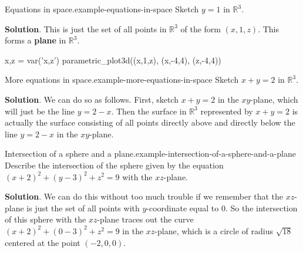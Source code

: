 \documentclass[10pt,]{book}
\newcommand{\terminology}[1]{\textbf{#1}}
\numberwithin{equation}{section}
\newcommand{\RR}{\mathbb{R}}
\begin{document}
\begin{example}{Equations in space.}{example-equations-in-space}%
\hypertarget{p-1067}{}%
Sketch \(y=1\) in \(\RR^{3}\).%
\par\smallskip%
\noindent\textbf{Solution}.\hypertarget{solution-205}{}\quad%
\hypertarget{p-1068}{}%
This is just the set of all points in \(\RR^{3}\) of the form \((x,1,z)\). This forms a \terminology{plane} in \(\RR^{3}\).%
\end{example}
\begin{sageinput}
x,z = var('x,z')
parametric_plot3d((x,1,z), (x,-4,4), (z,-4,4))
\end{sageinput}
\begin{example}{More equations in space.}{example-more-equations-in-space}%
\hypertarget{p-1069}{}%
Sketch \(x+y=2\) in \(\RR^{3}\).%
\par\smallskip%
\noindent\textbf{Solution}.\hypertarget{solution-206}{}\quad%
\hypertarget{p-1070}{}%
We can do so as follows. First, sketch \(x+y=2\) in the \(xy\)-plane, which will just be the line \(y = 2-x\). Then the surface in \(\RR^{3}\) represented by \(x+y=2\) is actually the surface consisting of all points directly above and directly below the line \(y=2-x\) in the \(xy\)-plane.%
\end{example}
\begin{example}{Intersection of a sphere and a plane.}{example-intersection-of-a-sphere-and-a-plane}%
\hypertarget{p-1071}{}%
Describe the intersection of the sphere given by the equation \((x+2)^{2} + (y-3)^{2} + z^{2} = 9\) with the \(xz\)-plane.%
\par\smallskip%
\noindent\textbf{Solution}.\hypertarget{solution-207}{}\quad%
\hypertarget{p-1072}{}%
We can do this without too much trouble if we remember that the \(xz\)-plane is just the set of all points with \(y\)-coordinate equal to \(0\). So the intersection of this sphere with the \(xz\)-plane traces out the curve \((x+2)^{2} + (0-3)^{2} + z^{2} = 9\) in the \(xz\)-plane, which is a circle of radius \(\sqrt{18}\) centered at the point \((-2,0,0)\).%
\end{example}
%
%
\typeout{************************************************}
\typeout{************************************************}
%
\end{document}
